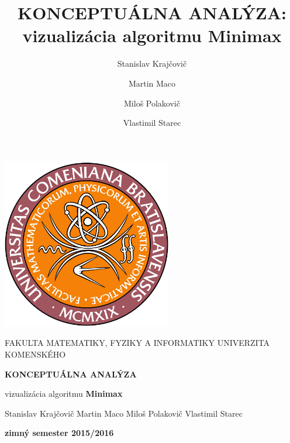 \documentclass{article}
\title{KONCEPTUÁLNA ANALÝZA: vizualizácia algoritmu Minimax}
\author{Stanislav Krajčovič \and Martin Maco \and Miloš Polakovič \and Vlastimil Starec}
\begin{document}
\begin{titlepage}
	\centering
	\includegraphics[width=20em]{images/fmfi_uk.jpg}
	\par\vspace{0.5cm}
	{\scshape\Large FAKULTA MATEMATIKY, FYZIKY A INFORMATIKY UNIVERZITA KOMENSKÉHO}
	\par\vspace{2cm}
	{\LARGE \textbf{KONCEPTUÁLNA ANALÝZA}}
	\par\vspace{0.2cm}
	{\Large vizualizácia algoritmu \textbf{Minimax}}
	\par\vfill
	Stanislav Krajčovič \quad Martin Maco \quad Miloš Polakovič \quad Vlastimil Starec
	\par\vspace{0.2cm}
	\textbf{zimný semester 2015/2016}
\end{titlepage}
\end{document}
